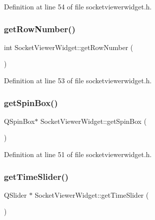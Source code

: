 Definition at line 54 of file socketviewerwidget.\+h.

\mbox{\label{class_socket_viewer_widget_a07e5f32f431c6113a140ea0c6c9d1aa4}} 
\subsubsection{\texorpdfstring{getRowNumber()}{getRowNumber()}}
{\footnotesize\ttfamily int Socket\+Viewer\+Widget\+::get\+Row\+Number (\begin{DoxyParamCaption}{ }\end{DoxyParamCaption})\hspace{0.3cm}{\ttfamily [inline]}}



Definition at line 53 of file socketviewerwidget.\+h.

\mbox{\label{class_socket_viewer_widget_abc87688771c9c1f3d0c7dcdf593a75eb}} 
\subsubsection{\texorpdfstring{getSpinBox()}{getSpinBox()}}
{\footnotesize\ttfamily Q\+Spin\+Box$\ast$ Socket\+Viewer\+Widget\+::get\+Spin\+Box (\begin{DoxyParamCaption}{ }\end{DoxyParamCaption})\hspace{0.3cm}{\ttfamily [inline]}}



Definition at line 51 of file socketviewerwidget.\+h.

\mbox{\label{class_socket_viewer_widget_a158278264f09fc04009af0876b7cf2aa}} 
\subsubsection{\texorpdfstring{getTimeSlider()}{getTimeSlider()}}
{\footnotesize\ttfamily Q\+Slider $\ast$ Socket\+Viewer\+Widget\+::get\+Time\+Slider (\begin{DoxyParamCaption}{ }\end{DoxyParamCaption})}



